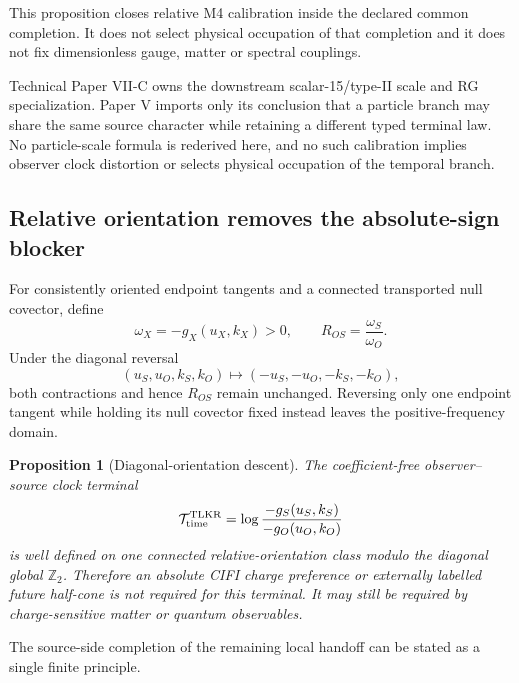 \documentclass[11pt]{article}
\newtheorem{proposition}{Proposition}
\begin{document}
This proposition closes relative M4 calibration inside the declared common
completion. It does not select physical occupation of that completion and it
does not fix dimensionless gauge, matter or spectral couplings.

Technical Paper VII-C owns the downstream scalar-15/type-II scale and RG
specialization. Paper V imports only its conclusion that a particle branch
may share the same source character while retaining a different typed
terminal law. No particle-scale formula is rederived here, and no such
calibration implies observer clock distortion or selects physical occupation
of the temporal branch.

\subsection{Relative orientation removes the absolute-sign blocker}

For consistently oriented endpoint tangents and a connected transported null
covector, define
\begin{equation}
 \omega_X=-g_X(u_X,k_X)>0,
 \qquad
 R_{OS}=\frac{\omega_S}{\omega_O}.
 \label{eq:clock-ratio}
\end{equation}
Under the diagonal reversal
\begin{equation}
 (u_S,u_O,k_S,k_O)\longmapsto(-u_S,-u_O,-k_S,-k_O),
 \label{eq:diagonal-reversal}
\end{equation}
both contractions and hence $R_{OS}$ remain unchanged. Reversing only one
endpoint tangent while holding its null covector fixed instead leaves the
positive-frequency domain.

\begin{proposition}[Diagonal-orientation descent]
The coefficient-free observer--source clock terminal
\begin{equation}
 \mathcal T_{\rm time}^{\rm TLKR}
 =\log\frac{-g_S(u_S,k_S)}{-g_O(u_O,k_O)}
 \label{eq:relative-time-terminal}
\end{equation}
is well defined on one connected relative-orientation class modulo the
diagonal global $\mathbb Z_2$. Therefore an absolute CIFI charge preference
or externally labelled future half-cone is not required for this terminal.
It may still be required by charge-sensitive matter or quantum observables.
\end{proposition}

The source-side completion of the remaining local handoff can be stated as a
single finite principle.
\end{document}
